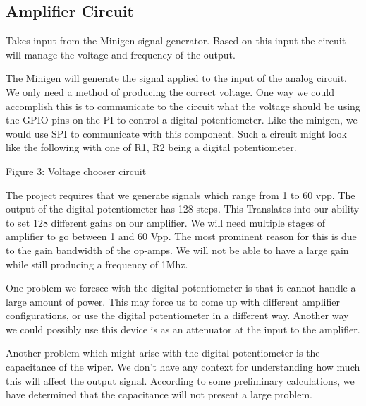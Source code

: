 \documentclass{article}	%
\begin{document}
\begin{multicols}{2}
\subsection{Amplifier Circuit}
Takes input from the Minigen signal generator. Based on this input the circuit will manage the voltage and frequency of the output.

The Minigen will generate the signal applied to the input of the analog circuit. We only need a method of producing the correct voltage. One way we could accomplish this is to communicate to the circuit what the voltage should be using the GPIO pins on the PI to control a digital potentiometer. Like the minigen, we would use SPI to communicate with this component. Such a circuit might look like the following with one of R1, R2 being a digital potentiometer.

Figure 3: Voltage chooser circuit

The project requires that we generate signals which range from 1 to 60 vpp. The output of the digital potentiometer has 128 steps. This Translates into our ability to set 128 different gains on our amplifier. We will need multiple stages of amplifier to go between 1 and 60 Vpp. The most prominent reason for this is due to the gain bandwidth of the op-amps. We will not be able to have a large gain while still producing a frequency of 1Mhz.

One problem we foresee with the digital potentiometer is that it cannot handle a large amount of power. This may force us to come up with different amplifier configurations, or use the digital potentiometer in a different way. Another way we could possibly use this device is as an attenuator at the input to the amplifier.

Another problem which might arise with the digital potentiometer is the capacitance of the wiper. We don’t have any context for understanding how much this will affect the output signal. According to some preliminary calculations, we have determined that the capacitance will not present a large problem.


\end{multicols}
\end{document}
